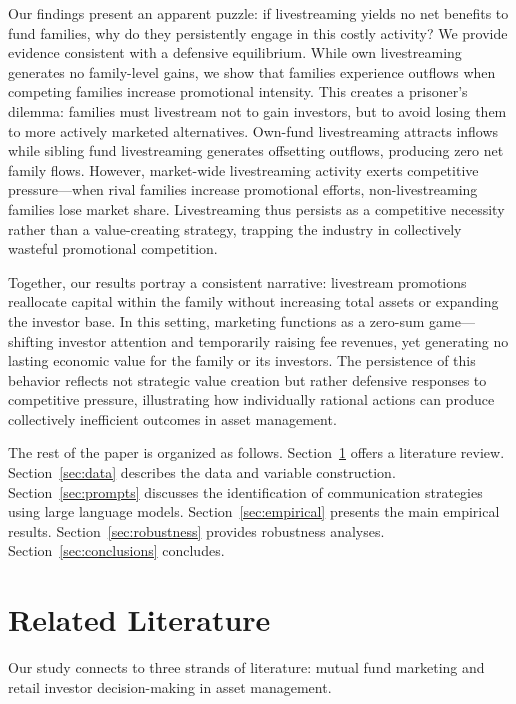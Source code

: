\documentclass[12pt]{article}
\begin{document}
Our findings present an apparent puzzle: if livestreaming yields no net benefits to fund families, why do they persistently engage in this costly activity? We provide evidence consistent with a defensive equilibrium. While own livestreaming generates no family-level gains, we show that families experience outflows when competing families increase promotional intensity. This creates a prisoner's dilemma: families must livestream not to gain investors, but to avoid losing them to more actively marketed alternatives. Own-fund livestreaming attracts inflows while sibling fund livestreaming generates offsetting outflows, producing zero net family flows. However, market-wide livestreaming activity exerts competitive pressure—when rival families increase promotional efforts, non-livestreaming families lose market share. Livestreaming thus persists as a competitive necessity rather than a value-creating strategy, trapping the industry in collectively wasteful promotional competition.

Together, our results portray a consistent narrative: livestream promotions reallocate capital within the family without increasing total assets or expanding the investor base. In this setting, marketing functions as a zero-sum game—shifting investor attention and temporarily raising fee revenues, yet generating no lasting economic value for the family or its investors. The persistence of this behavior reflects not strategic value creation but rather defensive responses to competitive pressure, illustrating how individually rational actions can produce collectively inefficient outcomes in asset management.

The rest of the paper is organized as follows. Section~\ref{sec:literature} offers a literature review. Section~\ref{sec:data} describes the data and variable construction. Section~\ref{sec:prompts} discusses the identification of communication strategies using large language models.  Section~\ref{sec:empirical} presents the main empirical results. Section~\ref{sec:robustness} provides robustness analyses. Section~\ref{sec:conclusions} concludes.

\section{Related Literature}\label{sec:literature}

Our study connects to three strands of literature: mutual fund marketing and retail investor decision-making in asset management.
\end{document}
